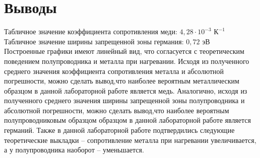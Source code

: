 \documentclass{article}%
\begin{document}
%
\section{Выводы}%
\label{sec:}%
Табличное значение коэффициента сопротивления меди: $4,28 \cdot 10^{-3} \text{ К}^{-1}$\\%
Табличное значение ширины запрещенной зоны германия: $0,72 \text{ эВ}$\\%
Построенные графики имеют линейный вид, что согласуется с теоретическим поведением полупроводника и металла при нагревании. Исходя из полученного среднего значения  коэффициента сопротивления металла и абсолютной погрешности, можно сделать вывод,что наиболее вероятным металлическим образцом в данной лабораторной работе является медь. Аналогично, исходя из полученного среднего значения  ширины запрещенной зоны полупроводника и абсолютной погрешности, можно сделать вывод,что наиболее вероятным полупроводниковым образцом образцом в данной лабораторной работе является германий. Также в данной лабораторной работе подтвердились следующие теоретические выкладки – сопротивление металла при нагревании увеличивается, а у полупроводника наоборот – уменьшается.

%
\end{document}
